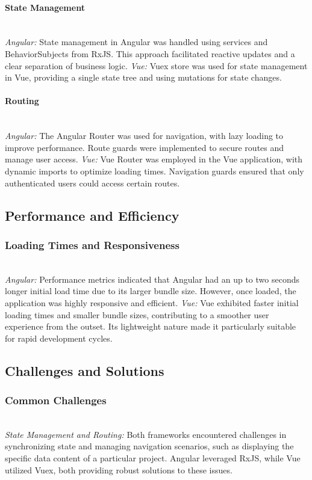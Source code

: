\documentclass[conference]{IEEEtran}
\begin{document}
\paragraph{State Management}
\textit{\\Angular: }State management in Angular was handled using services and BehaviorSubjects from RxJS. This approach facilitated reactive updates and a clear separation of business logic.
\newline\textit{Vue: }Vuex store was used for state management in Vue, providing a single state tree and using mutations for state changes.
\paragraph{Routing}
\textit{\\Angular: }The Angular Router was used for navigation, with lazy loading to improve performance. Route guards were implemented to secure routes and manage user access.
\newline\textit{Vue: }Vue Router was employed in the Vue application, with dynamic imports to optimize loading times. Navigation guards ensured that only authenticated users could access certain routes.

\subsection{Performance and Efficiency}
\subsubsection{Loading Times and Responsiveness}
\textit{\\Angular: }Performance metrics indicated that Angular had an up to two seconds longer initial load time due to its larger bundle size. However, once loaded, the application was highly responsive and efficient.
\newline\textit{Vue: }Vue exhibited faster initial loading times and smaller bundle sizes, contributing to a smoother user experience from the outset. Its lightweight nature made it particularly suitable for rapid development cycles.
\subsection{Challenges and Solutions}
\subsubsection{Common Challenges}
\textit{\\State Management and Routing:} Both frameworks encountered challenges in synchronizing state and managing navigation scenarios, such as displaying the specific data content of a particular project. Angular leveraged RxJS, while Vue utilized Vuex, both providing robust solutions to these issues.
\newline
\end{document}
